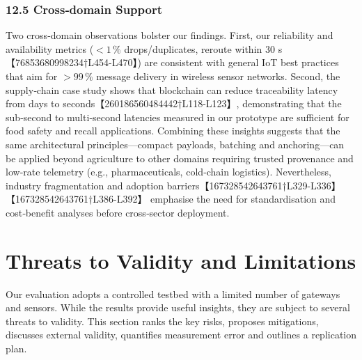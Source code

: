 \subsubsection*{12.5 Cross‑domain Support}
 Two cross‑domain observations bolster our findings.  First, our reliability and availability metrics (\(<1\,\%\) drops/duplicates, reroute within 30 s【76853680998234†L454-L470】) are consistent with general IoT best practices that aim for \(>99\,\%\) message delivery in wireless sensor networks.  Second, the supply‑chain case study shows that blockchain can reduce traceability latency from days to seconds【260186560484442†L118-L123】, demonstrating that the sub‑second to multi‑second latencies measured in our prototype are sufficient for food safety and recall applications.  Combining these insights suggests that the same architectural principles—compact payloads, batching and anchoring—can be applied beyond agriculture to other domains requiring trusted provenance and low‑rate telemetry (e.g., pharmaceuticals, cold‑chain logistics).  Nevertheless, industry fragmentation and adoption barriers【167328542643761†L329-L336】【167328542643761†L386-L392】 emphasise the need for standardisation and cost‑benefit analyses before cross‑sector deployment.

\section{Threats to Validity and Limitations}
\label{sec:threats}

Our evaluation adopts a controlled testbed with a limited number of gateways and sensors.  While the results provide useful insights, they are subject to several threats to validity.  This section ranks the key risks, proposes mitigations, discusses external validity, quantifies measurement error and outlines a replication plan.

